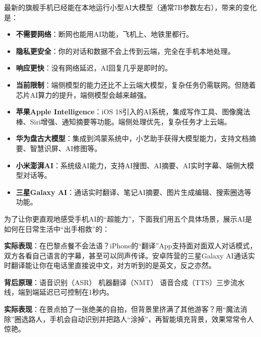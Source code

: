 
最新的旗舰手机已经能在本地运行小型AI大模型（通常7B参数左右），带来的变化是：

\begin{itemize}
  \item \textbf{不需要网络}：断网也能用AI功能，飞机上、地铁里都行。
  \item \textbf{隐私更安全}：你的对话和数据不会上传到云端，完全在手机本地处理。
  \item \textbf{响应更快}：没有网络延迟，AI回复几乎是即时的。
  \item \textbf{当前限制}：端侧模型的能力还比不上云端大模型，复杂任务仍需联网。但随着芯片AI算力的提升，端侧模型会越来越强。
\end{itemize}


\begin{itemize}
  \item \textbf{苹果Apple Intelligence}：iOS 18引入的AI系统，集成写作工具、图像魔法棒、Siri增强、通知摘要等功能。端侧处理优先，复杂任务才上云端。
  \item \textbf{华为盘古大模型}：集成到鸿蒙系统中，小艺助手获得大模型能力，支持文档摘要、智慧识屏、AI修图等。
  \item \textbf{小米澎湃AI}：系统级AI能力，支持AI搜图、AI摘要、AI实时字幕、端侧大模型对话等。
  \item \textbf{三星Galaxy AI}：通话实时翻译、笔记AI摘要、图片生成编辑、搜索圈选等功能。
\end{itemize}


为了让你更直观地感受手机AI的“超能力”，下面我们用五个具体场景，展示AI是如何在日常生活中“出手相救”的：


\textbf{实际表现}：在巴黎点餐不会法语？iPhone的“翻译”App支持面对面双人对话模式，双方各看自己语言的字幕，甚至可以同声传译。安卓阵营的三星Galaxy AI通话实时翻译能让你在电话里直接说中文，对方听到的是英文，反之亦然。

\textbf{背后原理}：语音识别（ASR） 机器翻译（NMT） 语音合成（TTS）三步流水线，端到端延迟已可控制在1秒内。


\textbf{实际表现}：在景点拍了一张绝美的自拍，但背景里挤满了其他游客？用“魔法消除”圈选路人，手机会自动识别并把路人“涂掉”，再智能填充背景，效果常常令人惊艳。

